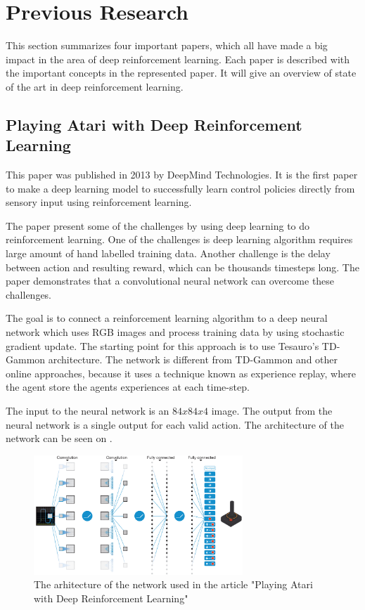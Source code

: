 \section{Previous Research}
\label{Previous_Research}
This section summarizes four important papers, which all have made a big impact in the area of deep reinforcement learning. Each paper is described with the important concepts in the represented paper. It will give an overview of state of the art in deep reinforcement learning.    

\subsection{Playing Atari with Deep Reinforcement Learning }\cite{DBLP:journals/corr/MnihKSGAWR13}
This paper was published in 2013 by DeepMind Technologies. It is the first paper to make a deep learning model to successfully learn control policies directly from sensory input using reinforcement learning. 

The paper present some of the challenges by using deep learning to do reinforcement learning. One of the challenges is deep learning algorithm requires large amount of hand labelled training data. Another challenge is the delay between action and resulting reward, which can be thousands timesteps long. The paper demonstrates that a convolutional neural network can overcome these challenges.  

The goal is to connect a reinforcement learning algorithm to a deep neural network which uses RGB images and process training data by using stochastic gradient update. The starting point for this approach is to use Tesauro's TD-Gammon \cite{Tesauro:1995:TDL:203330.203343} architecture. The network is different from TD-Gammon and other online approaches, because it uses a technique known as experience replay, where the agent store the agents experiences at each time-step.

The input to the neural network is an $84 x 84 x 4$ image. The output from the neural network is a single output for each valid action. The architecture of the network can be seen on .    
\begin{figure}[H]
	\centering
	\includegraphics[width=0.7\textwidth]{Figures/TheoreticalBackground/playing_atari.jpg}
	\caption{The arhitecture of the network used in the article "Playing Atari with Deep Reinforcement Learning"}
	\label{fig:playing_atari}
\end{figure} 

